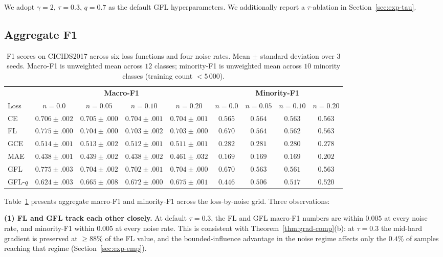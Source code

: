 \documentclass[conference]{IEEEtran}
\theoremstyle{definition}
\begin{document}
We adopt $\gamma = 2$, $\tau = 0.3$, $q = 0.7$ as the default GFL hyperparameters. We additionally report a $\tau$-ablation in Section~\ref{sec:exp-tau}.

\subsection{Aggregate F1}
\label{sec:exp-f1-agg}

\begin{table}[t]
\caption{F1 scores on CICIDS2017 across six loss functions and four noise rates. Mean $\pm$ standard deviation over $3$ seeds. Macro-F1 is unweighted mean across $12$ classes; minority-F1 is unweighted mean across $10$ minority classes (training count $< 5\,000$).}
\label{tab:f1-aggregate}
\centering
\small
\setlength{\tabcolsep}{4pt}
\begin{tabular}{l|cccc|cccc}
\toprule
& \multicolumn{4}{c|}{\textbf{Macro-F1}} & \multicolumn{4}{c}{\textbf{Minority-F1}} \\
Loss & $n{=}0.0$ & $n{=}0.05$ & $n{=}0.10$ & $n{=}0.20$ & $n{=}0.0$ & $n{=}0.05$ & $n{=}0.10$ & $n{=}0.20$ \\
\midrule
CE     & $0.706 \pm .002$ & $0.705 \pm .000$ & $0.704 \pm .001$ & $0.704 \pm .001$ & $0.565$ & $0.564$ & $0.563$ & $0.563$ \\
FL     & $0.775 \pm .000$ & $0.704 \pm .000$ & $0.703 \pm .002$ & $0.703 \pm .000$ & $0.670$ & $0.564$ & $0.562$ & $0.563$ \\
GCE    & $0.514 \pm .001$ & $0.513 \pm .002$ & $0.512 \pm .001$ & $0.511 \pm .001$ & $0.282$ & $0.281$ & $0.280$ & $0.278$ \\
MAE    & $0.438 \pm .001$ & $0.439 \pm .002$ & $0.438 \pm .002$ & $0.461 \pm .032$ & $0.169$ & $0.169$ & $0.169$ & $0.202$ \\
GFL    & $0.775 \pm .003$ & $0.704 \pm .002$ & $0.702 \pm .001$ & $0.704 \pm .000$ & $0.670$ & $0.563$ & $0.561$ & $0.563$ \\
GFL-$q$ & $0.624 \pm .003$ & $0.665 \pm .008$ & $0.672 \pm .000$ & $0.675 \pm .001$ & $0.446$ & $0.506$ & $0.517$ & $0.520$ \\
\bottomrule
\end{tabular}
\end{table}

Table~\ref{tab:f1-aggregate} presents aggregate macro-F1 and minority-F1 across the loss-by-noise grid. Three observations:

\textbf{(1) FL and GFL track each other closely.} At default $\tau = 0.3$, the FL and GFL macro-F1 numbers are within $0.005$ at every noise rate, and minority-F1 within $0.005$ at every noise rate. This is consistent with Theorem~\ref{thm:grad-comp}(b): at $\tau = 0.3$ the mid-hard gradient is preserved at $\ge 88\%$ of the FL value, and the bounded-influence advantage in the noise regime affects only the $0.4\%$ of samples reaching that regime (Section~\ref{sec:exp-emp}).
\end{document}
